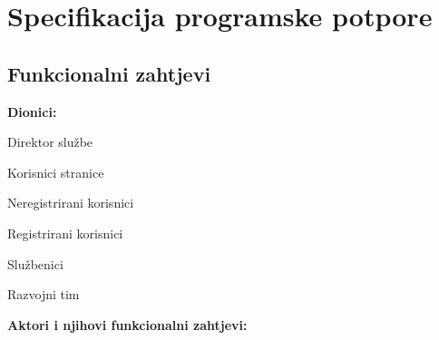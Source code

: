 \chapter{Specifikacija programske potpore}
		
	\section{Funkcionalni zahtjevi}
			
			\noindent \textbf{Dionici:}
			
			\begin{packed_enum}
				
				\item Direktor službe
				\item Korisnici stranice
				
				\begin{packed_enum}
				
						\item Neregistrirani korisnici
						\item Registrirani korisnici
						
				\end{packed_enum}
				
				\item Službenici	
				\item Razvojni tim	
				
				
			\end{packed_enum}
			
			\noindent \textbf{Aktori i njihovi funkcionalni zahtjevi:}
			
